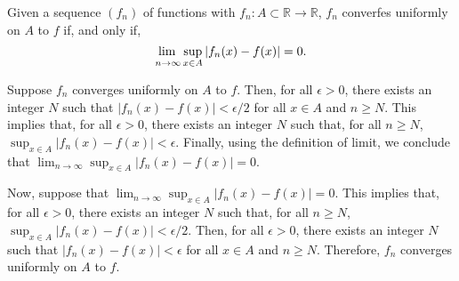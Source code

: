 \begin{thm}{}{}
  Given a sequence \((f_n)\) of functions with \(f_n \colon A \subset \mathbb{R} \to \mathbb{R}\), \(f_n\) converfes uniformly on \(A\) to \(f\) if, and only if, \[
    \adjustlimits\lim_{n\to\infty} \sup_{x\in A} |f_n(x) - f(x)| = 0.
  \]
\end{thm}
\begin{dem}{}{}
  Suppose \(f_n\) converges uniformly on \(A\) to \(f\).
  Then, for all \(\epsilon > 0\), there exists an integer \(N\) such that \( |f_n(x) - f(x) | < \epsilon/2 \) for all \(x \in A\) and \(n \geq N\).
  This implies that, for all \(\epsilon > 0\), there exists an integer \(N\) such that, for all \(n \geq N\), \( \sup_{x\in A} |f_n(x) - f(x)| < \epsilon.\)
  Finally, using the definition of limit, we conclude that \( \lim_{n\to\infty} \sup_{x\in A} |f_n(x) - f(x)| = 0.  \) 

  Now, suppose that \( \lim_{n\to\infty} \sup_{x\in A} |f_n(x) - f(x)| = 0.  \) 
  This implies that, for all \(\epsilon > 0\), there exists an integer \(N\) such that, for all \(n \geq N\), \( \sup_{x\in A} |f_n(x) - f(x)| < \epsilon/2.\)
  Then, for all \(\epsilon > 0\), there exists an integer \(N\) such that \( |f_n(x) - f(x) | < \epsilon \) for all \(x \in A\) and \(n \geq N\). Therefore, \(f_n\) converges uniformly on \(A\) to \(f\).
\end{dem}
